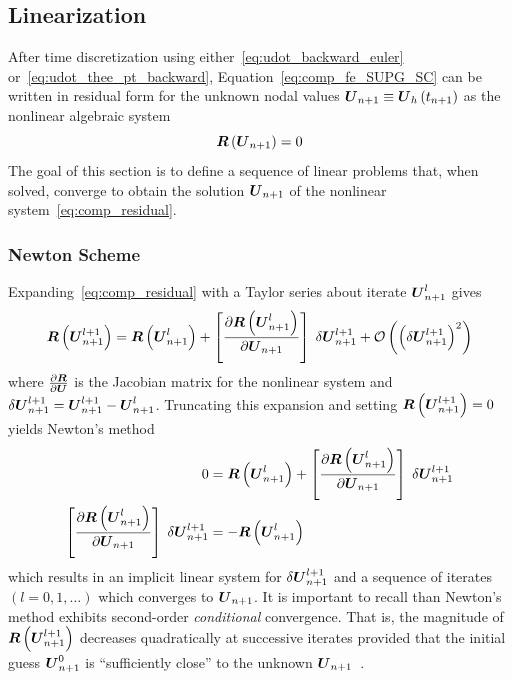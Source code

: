 \subsection{Linearization}
After time discretization using either~\eqref{eq:udot_backward_euler} or~\eqref{eq:udot_thee_pt_backward}, Equation~\eqref{eq:comp_fe_SUPG_SC} can be written in residual form for the unknown nodal values ${\boldsymbol{U}}_{n+1}\equiv{\boldsymbol{U}}_h\left(t_{n+1}\right)$ as the nonlinear algebraic system
\begin{equation}
  \label{eq:comp_residual}  
  {\boldsymbol{R}}\left({\boldsymbol{U}}_{n+1}\right) = 0 
\end{equation}
The goal of this section is to define a sequence of linear problems that, when solved, converge to obtain the solution ${\boldsymbol{U}}_{n+1}$ of the nonlinear system~\eqref{eq:comp_residual}.

\subsubsection{Newton Scheme}
 Expanding~\eqref{eq:comp_residual} with a Taylor series about iterate ${\boldsymbol{U}}_{n+1}^l$ gives
\begin{equation}
  \label{eq:comp_residual_linearized}  
  {\boldsymbol{R}}\left({\boldsymbol{U}}_{n+1}^{l+1}\right) = {\boldsymbol{R}}\left({\boldsymbol{U}}_{n+1}^l\right) +\left[{\frac{\partial{{\boldsymbol{R}}\left({\boldsymbol{U}}_{n+1}^l\right)}}{\partial{{\boldsymbol{U}}_{n+1}}}}\right]\;\delta{\boldsymbol{U}}_{n+1}^{l+1} + \mathcal{O}\left(\left(\delta{\boldsymbol{U}}_{n+1}^{l+1}\right)^2\right)
\end{equation}
where ${\frac{\partial{{\boldsymbol{R}}}}{\partial{{\boldsymbol{U}}}}}$ is the Jacobian matrix for the nonlinear system and $\delta {\boldsymbol{U}}_{n+1}^{l+1}={\boldsymbol{U}}_{n+1}^{l+1}-{\boldsymbol{U}}_{n+1}^l$. Truncating this expansion and setting ${\boldsymbol{R}}\left({\boldsymbol{U}}_{n+1}^{l+1}\right)=0$ yields Newton's method
\begin{align}
  0 &= {\boldsymbol{R}}\left({\boldsymbol{U}}_{n+1}^l\right) + \left[{\frac{\partial{{\boldsymbol{R}}\left({\boldsymbol{U}}_{n+1}^l\right)}}{\partial{{\boldsymbol{U}}_{n+1}}}}\right]\;\delta{\boldsymbol{U}}_{n+1}^{l+1} \nonumber \\
  \left[{\frac{\partial{{\boldsymbol{R}}\left({\boldsymbol{U}}_{n+1}^l\right)}}{\partial{{\boldsymbol{U}}_{n+1}}}}\right]\;\delta{\boldsymbol{U}}_{n+1}^{l+1} &= -{\boldsymbol{R}}\left({\boldsymbol{U}}_{n+1}^l\right) \label{eq:comp_newton_system}
\end{align}
which results in an implicit linear system for $\delta{\boldsymbol{U}}_{n+1}^{l+1}$ and a sequence of iterates $(l=0,1,\ldots)$ which converges to ${\boldsymbol{U}}_{n+1}$.  It is important to recall than Newton's method exhibits second-order \emph{conditional} convergence. That is, the magnitude of ${\boldsymbol{R}}\left({\boldsymbol{U}}_{n+1}^{l+1}\right)$ decreases quadratically at successive iterates provided that the initial guess ${\boldsymbol{U}}_{n+1}^0$ is ``sufficiently close'' to the unknown ${\boldsymbol{U}}_{n+1}$~\cite{iserles_numerical_analysis,greenberg_applied_math}.

